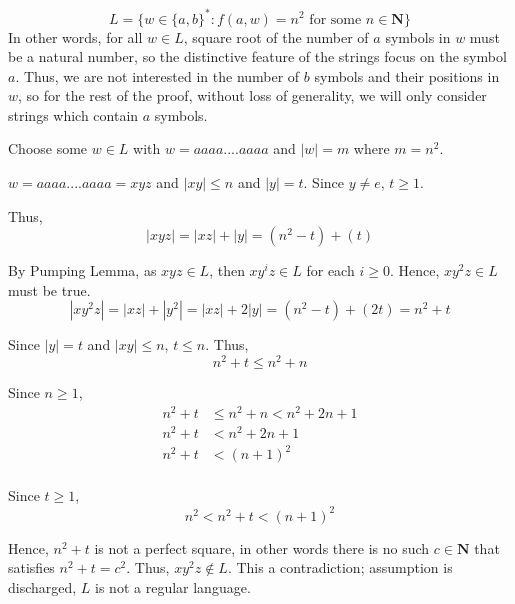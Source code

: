 \documentclass[12pt]{article}
\begin{document}
\begin{equation*}
	L = \{w \in \{a, b\}^*: f(a, w) = n^2\text{ for some }n \in \mathbf{N}\}
\end{equation*}
In other words, for all $w \in L$, square root of the number of $a$ symbols in $w$ must be a natural number, so the distinctive feature of the strings focus on the symbol $a$. Thus, we are not interested in the number of $b$ symbols and their positions in $w$, so for the rest of the proof, without loss of generality, we will only consider strings which contain $a$ symbols.

Choose some $w \in L$ with $w = aaaa....aaaa$ and $|w| = m$ where $m = n^2$.

$w = aaaa....aaaa = xyz$ and $|xy| \leq n$ and $|y| = t$. Since $y \neq e$, $t \geq 1$.

Thus,
\begin{equation*}
	|xyz| = |xz| + |y| = (n^2 - t) + (t)
\end{equation*}

By Pumping Lemma, as $xyz \in L$, then $xy^iz \in L$ for each $i \geq 0$. Hence, $xy^2z \in L$ must be true.
\begin{equation*}
	|xy^2z| = |xz| + |y^2| = |xz| + 2|y| = (n^2 - t) + (2t) = n^2 + t
\end{equation*}

Since $|y| = t$ and $|xy| \leq n$, $t \leq n$. Thus,
\begin{equation*}
	n^2 + t \leq n^2 + n
\end{equation*}

Since $n \geq 1$,
\begin{equation*}
	\begin{split}
		n^2 + t & \leq n^2 + n < n^2 + 2n + 1 \\
		n^2 + t & < n^2 + 2n + 1 \\
		n^2 + t & < (n + 1)^2 \\
	\end{split}
\end{equation*}

Since $t \geq 1$,
\begin{equation*}
	n^2 < n^2 + t < (n + 1)^2
\end{equation*}

Hence, $n^2 + t$ is not a perfect square, in other words there is no such $c \in \mathbf{N}$ that satisfies $n^2 + t = c^2$. Thus, $xy^2z \notin L$. This a contradiction; assumption is discharged, $L$ is not a regular language.
\end{document}
